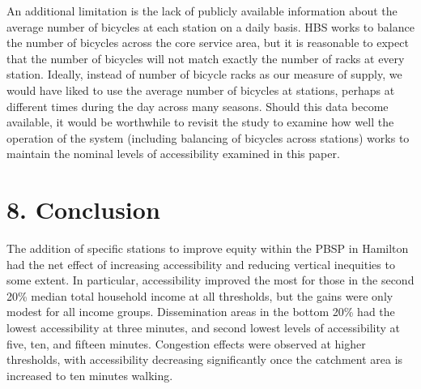 \documentclass[]{elsarticle} %
\begin{document}
An additional limitation is the lack of publicly available information
about the average number of bicycles at each station on a daily basis.
HBS works to balance the number of bicycles across the core service
area, but it is reasonable to expect that the number of bicycles will
not match exactly the number of racks at every station. Ideally, instead
of number of bicycle racks as our measure of supply, we would have liked
to use the average number of bicycles at stations, perhaps at different
times during the day across many seasons. Should this data become
available, it would be worthwhile to revisit the study to examine how
well the operation of the system (including balancing of bicycles across
stations) works to maintain the nominal levels of accessibility examined
in this paper.

\hypertarget{conclusion}{%
\section{8. Conclusion}\label{conclusion}}

The addition of specific stations to improve equity within the PBSP in
Hamilton had the net effect of increasing accessibility and reducing
vertical inequities to some extent. In particular, accessibility
improved the most for those in the second 20\% median total household
income at all thresholds, but the gains were only modest for all income
groups. Dissemination areas in the bottom 20\% had the lowest
accessibility at three minutes, and second lowest levels of
accessibility at five, ten, and fifteen minutes. Congestion effects were
observed at higher thresholds, with accessibility decreasing
significantly once the catchment area is increased to ten minutes
walking.
\end{document}
